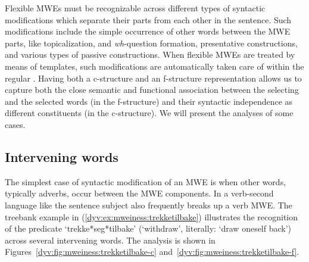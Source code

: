 \documentclass[output=paper]{langsci/langscibook}
\begin{document}
%
%


Flexible MWEs must be recognizable across different types of syntactic modifications which separate their parts from each other in the sentence.
Such modifications include the simple occurrence of other words between the MWE parts,  like topicalization,  and \textit{wh}-question formation, presentative constructions, and various types of passive constructions.
When flexible MWEs are treated by means of  templates, such modifications are automatically taken care of within the regular .
Having both a c-structure and an f-structure representation allows us to capture both the close semantic and functional association between the selecting and the selected words (in the f-structure) and their syntactic independence as different constituents (in the c-structure).
We will present the analyses of some cases.

\subsection{Intervening words}

The simplest case of syntactic modification of an MWE is when other words, typically adverbs, occur between the MWE components.
In a verb-second language like  the sentence subject also frequently breaks up a verb  MWE.
The treebank example in (\ref{dyv:ex:mweiness:trekketilbake})  illustrates the recognition of the predicate `trekke*seg*tilbake' (`withdraw', literally: `draw oneself back') across several intervening words.
The analysis is shown in Figures~\ref{dyv:fig:mweiness:trekketilbake-c} and~\ref{dyv:fig:mweiness:trekketilbake-f}. 
\end{document}
